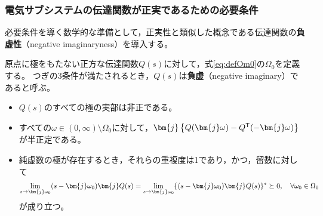 \documentclass[tombow,dvipdfmx]{corona-a5-1.1}
\begin{document}
\smallskip
\subsubsection{電気サブシステムの伝達関数が正実であるための必要条件}


必要条件を導く数学的な準備として，正実性と類似した概念である伝達関数の\textbf{負虚性}（negative imaginaryness）を導入する\cite{petersen2010feedback,xiong2010negative}。

\begin{定義}[伝達関数の負虚性]
\label{def:trni}
原点に極をもたない正方な伝達関数$Q(s)$に対して，式\ref{eq:defOm0}の$\Omega_0$を定義する。
つぎの3条件が満たされるとき，$Q(s)$は\textbf{負虚}（negative imaginary）であると呼ぶ。
\begin{itemize}
\item $Q(s)$のすべての極の実部は非正である。
\item すべての$\omega \in (0,\infty)\setminus \Omega_0$に対して，$\bm{j}\left\{Q(\bm{j} \omega) - Q^{\sf T}(-\bm{j} \omega) \right\}$が半正定である。
\item 純虚数の極が存在するとき，それらの重複度は1であり，かつ，留数に対して
\begin{align*}
\lim_{s \rightarrow \bm{j} \omega_0} (s-\bm{j} \omega_0) \bm{j} Q(s) = 
\lim_{s\rightarrow \bm{j} \omega_0} \{ (s-\bm{j} \omega_0) \bm{j} Q(s)\}^{\sf *}\succeq 0
,\quad
\forall \omega_0 \in \Omega_0
\end{align*}
が成り立つ。
\end{itemize}
\end{定義}
\end{document}
